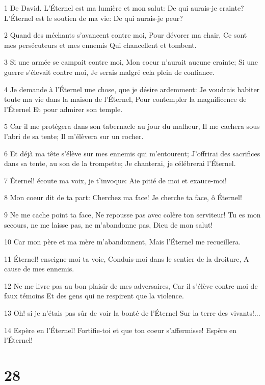 \par 1 De David. L'Éternel est ma lumière et mon salut: De qui aurais-je crainte? L'Éternel est le soutien de ma vie: De qui aurais-je peur?
\par 2 Quand des méchants s'avancent contre moi, Pour dévorer ma chair, Ce sont mes persécuteurs et mes ennemis Qui chancellent et tombent.
\par 3 Si une armée se campait contre moi, Mon coeur n'aurait aucune crainte; Si une guerre s'élevait contre moi, Je serais malgré cela plein de confiance.
\par 4 Je demande à l'Éternel une chose, que je désire ardemment: Je voudrais habiter toute ma vie dans la maison de l'Éternel, Pour contempler la magnificence de l'Éternel Et pour admirer son temple.
\par 5 Car il me protégera dans son tabernacle au jour du malheur, Il me cachera sous l'abri de sa tente; Il m'élèvera sur un rocher.
\par 6 Et déjà ma tête s'élève sur mes ennemis qui m'entourent; J'offrirai des sacrifices dans sa tente, au son de la trompette; Je chanterai, je célébrerai l'Éternel.
\par 7 Éternel! écoute ma voix, je t'invoque: Aie pitié de moi et exauce-moi!
\par 8 Mon coeur dit de ta part: Cherchez ma face! Je cherche ta face, ô Éternel!
\par 9 Ne me cache point ta face, Ne repousse pas avec colère ton serviteur! Tu es mon secours, ne me laisse pas, ne m'abandonne pas, Dieu de mon salut!
\par 10 Car mon père et ma mère m'abandonnent, Mais l'Éternel me recueillera.
\par 11 Éternel! enseigne-moi ta voie, Conduis-moi dans le sentier de la droiture, A cause de mes ennemis.
\par 12 Ne me livre pas au bon plaisir de mes adversaires, Car il s'élève contre moi de faux témoins Et des gens qui ne respirent que la violence.
\par 13 Oh! si je n'étais pas sûr de voir la bonté de l'Éternel Sur la terre des vivants!...
\par 14 Espère en l'Éternel! Fortifie-toi et que ton coeur s'affermisse! Espère en l'Éternel!

\chapter{28}

